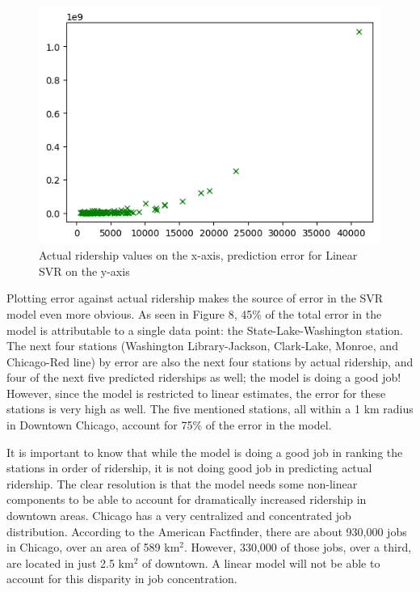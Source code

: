 \documentclass{article}
\begin{document}
\begin{figure}[H]\label{fig:f8}
\begin{center}\includegraphics[scale=1]{actual_vs_error_chi}\end{center}
\caption{Actual ridership values on the x-axis, prediction error for Linear SVR on the y-axis}
\end{figure}

Plotting error against actual ridership makes the source of error in the SVR model even more obvious. As seen in Figure 8, 45\% of the total error in the model is attributable to a single data point: the State-Lake-Washington station. The next four stations (Washington Library-Jackson, Clark-Lake, Monroe, and Chicago-Red line) by error are also the next four stations by actual ridership, and four of the next five predicted riderships as well; the model is doing a good job! However, since the model is restricted to linear estimates, the error for these stations is very high as well. The five mentioned stations, all within a 1 km radius in Downtown Chicago, account for 75\% of the error in the model.

It is important to know that while the model is doing a good job in ranking the stations in order of ridership, it is not doing good job in predicting actual ridership. The clear resolution is that the model needs some non-linear components to be able to account for dramatically increased ridership in downtown areas. Chicago has a very centralized and concentrated job distribution. According to the American Factfinder, there are about 930,000 jobs in Chicago, over an area of 589 km$^2$. However, 330,000 of those jobs, over a third, are located in just 2.5 km$^2$ of downtown. A linear model will not be able to account for this disparity in job concentration. 
\end{document}
